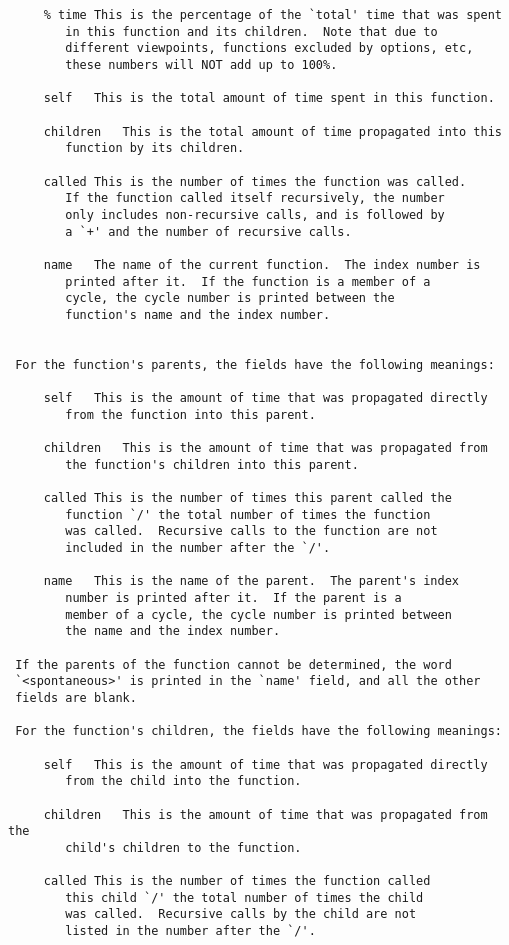 \documentclass{article}
\begin{document}
\begin{verbatim}
     % time	This is the percentage of the `total' time that was spent
		in this function and its children.  Note that due to
		different viewpoints, functions excluded by options, etc,
		these numbers will NOT add up to 100%.

     self	This is the total amount of time spent in this function.

     children	This is the total amount of time propagated into this
		function by its children.

     called	This is the number of times the function was called.
		If the function called itself recursively, the number
		only includes non-recursive calls, and is followed by
		a `+' and the number of recursive calls.

     name	The name of the current function.  The index number is
		printed after it.  If the function is a member of a
		cycle, the cycle number is printed between the
		function's name and the index number.


 For the function's parents, the fields have the following meanings:

     self	This is the amount of time that was propagated directly
		from the function into this parent.

     children	This is the amount of time that was propagated from
		the function's children into this parent.

     called	This is the number of times this parent called the
		function `/' the total number of times the function
		was called.  Recursive calls to the function are not
		included in the number after the `/'.

     name	This is the name of the parent.  The parent's index
		number is printed after it.  If the parent is a
		member of a cycle, the cycle number is printed between
		the name and the index number.

 If the parents of the function cannot be determined, the word
 `<spontaneous>' is printed in the `name' field, and all the other
 fields are blank.

 For the function's children, the fields have the following meanings:

     self	This is the amount of time that was propagated directly
		from the child into the function.

     children	This is the amount of time that was propagated from the
		child's children to the function.

     called	This is the number of times the function called
		this child `/' the total number of times the child
		was called.  Recursive calls by the child are not
		listed in the number after the `/'.


\end{verbatim}
\end{document}
